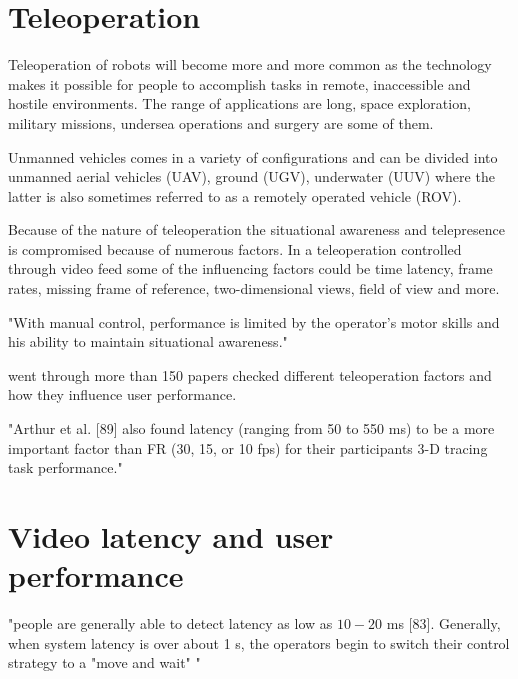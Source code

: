 \section{Teleoperation}


Teleoperation of robots will become more and more common as the technology makes it possible for people to accomplish tasks in remote, inaccessible and hostile environments. The range of applications are long, space exploration, military missions, undersea operations and surgery are some of them.

Unmanned vehicles comes in a variety of configurations and can be divided into unmanned aerial vehicles (UAV), ground (UGV), underwater (UUV) where the latter is also sometimes referred to as a remotely operated vehicle (ROV).

Because of the nature of teleoperation the situational awareness and telepresence is compromised because of numerous factors. In a teleoperation controlled through video feed some of the influencing factors could be time latency, frame rates, missing frame of reference, two-dimensional views, field of view and more.

\citep{Fong2001} "With manual control, performance is limited by the operator's motor skills and his ability to maintain situational awareness."

\citep{Chen2007} went through more than 150 papers checked different teleoperation factors and how they influence user performance.

"Arthur et al. [89] also found latency (ranging from 50 to 550 ms) to be a more important factor than FR (30, 15, or 10 fps) for their participants 3-D tracing task performance."

\section{Video latency and user performance}

\citep{Chen2007}

"people are generally able to detect latency as low as $10-20$ ms [83]. Generally, when system latency is over about 1 s, the operators begin to switch their control strategy to a "move and wait" "

